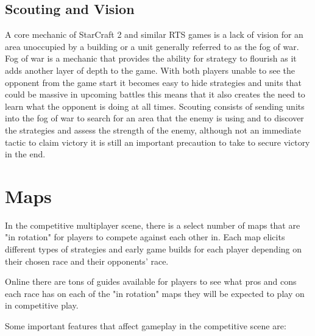 \documentclass[a4paper,12pt]{report}
\begin{document}
\subsection{Scouting and Vision}

A core mechanic of StarCraft 2 and similar RTS games is a lack of vision for an area unoccupied by a building or a unit generally referred to as the fog of war. Fog of war is a mechanic that provides the ability for strategy to flourish as it adds another layer of depth to the game. With both players unable to see the opponent from the game start it becomes easy to hide strategies and units that could be massive in upcoming battles this means that it also creates the need to learn what the opponent is doing at all times. Scouting consists of sending units into the fog of war to search for an area that the enemy is using and to discover the strategies and assess the strength of the enemy, although not an immediate tactic to claim victory it is still an important precaution to take to secure victory in the end.

\section{Maps}

In the competitive multiplayer scene, there is a select number of maps that are "in rotation" for players to compete against each other in. Each map elicits different types of strategies and early game builds for each player depending on their chosen race and their opponents’ race.

Online there are tons of guides available for players to see what pros and cons each race has on each of the "in rotation" maps they will be expected to play on in competitive play.

Some important features that affect gameplay in the competitive scene are:
\end{document}
